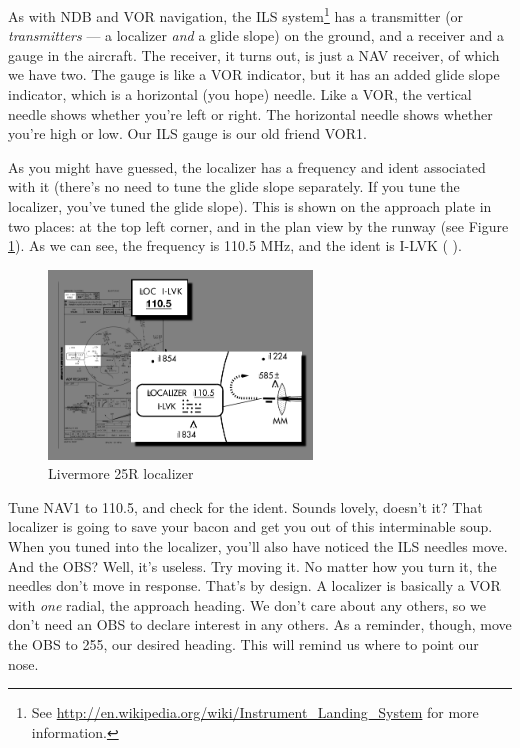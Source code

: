 As with NDB and VOR navigation, the ILS system\footnote{See
  \url{http://en.wikipedia.org/wiki/Instrument_Landing_System} for
  more information.} has a transmitter (or \emph{transmitters} --- a
localizer \emph{and} a glide slope) on the ground, and a receiver and
a gauge in the aircraft.  The receiver, it turns out, is just a NAV
receiver, of which we have two.  The gauge is like a VOR indicator,
but it has an added glide slope indicator, which is a horizontal (you
hope) needle.  Like a VOR, the vertical needle shows whether you're
left or right.  The horizontal needle shows whether you're high or
low.  Our ILS gauge is our old friend VOR1.

As you might have guessed, the localizer has a frequency and ident
associated with it (there's no need to tune the glide slope
separately.  If you tune the localizer, you've tuned the glide slope).
This is shown on the approach plate in two places: at the top left
corner, and in the plan view by the runway (see Figure
\ref{fig:localizer}).  As we can see, the frequency is 110.5 MHz, and
the ident is I-LVK (\mdot\mdot\mspace \mdot\mdash\mdot\mdot\mspace
\mdot\mdot\mdot\mdash\mspace \mdash\mdot\mdash).


\begin{figure}
  \begin{center}
    \includegraphics[width=7cm]{img/localizer.png}
    \caption{Livermore 25R localizer}
    \label{fig:localizer}
  \end{center}
\end{figure}

Tune NAV1 to 110.5, and check for the ident.  Sounds lovely, doesn't
it?  That localizer is going to save your bacon and get you out of
this interminable soup.  When you tuned into the localizer, you'll
also have noticed the ILS needles move.  And the OBS?  Well, it's
useless.  Try moving it.  No matter how you turn it, the needles don't
move in response.  That's by design.  A localizer is basically a VOR
with \emph{one} radial, the approach heading.  We don't care about any
others, so we don't need an OBS to declare interest in any others.  As
a reminder, though, move the OBS to 255, our desired heading.  This
will remind us where to point our nose.

